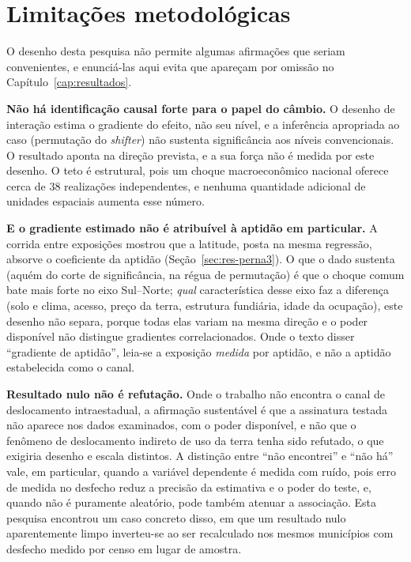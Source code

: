 \section{Limitações metodológicas}
\label{sec:met-limites}

O desenho desta pesquisa não permite algumas afirmações que seriam
convenientes, e enunciá-las aqui evita que apareçam por omissão no
Capítulo~\ref{cap:resultados}.

\textbf{Não há identificação causal forte para o papel do câmbio.} O desenho
de interação estima o gradiente do efeito, não seu nível, e a inferência
apropriada ao caso (permutação do \emph{shifter}) não sustenta significância
aos níveis convencionais. O resultado aponta na direção prevista, e a sua força
não é medida por este desenho. O
teto é estrutural, pois um choque macroeconômico nacional oferece cerca de 38
realizações independentes, e nenhuma quantidade adicional de unidades
espaciais aumenta esse número.

\textbf{E o gradiente estimado não é atribuível à aptidão em particular.} A
corrida entre exposições mostrou que a latitude, posta na mesma regressão,
absorve o coeficiente da aptidão (Seção~\ref{sec:res-perna3}). O que o dado
sustenta (aquém do corte de significância, na régua de permutação) é
que o choque comum bate mais forte no eixo Sul--Norte; \emph{qual}
característica desse eixo faz a diferença (solo e clima, acesso, preço da
terra, estrutura fundiária, idade da ocupação), este desenho não separa,
porque todas elas variam na mesma direção e o poder disponível não distingue
gradientes correlacionados. Onde o texto disser ``gradiente de aptidão'',
leia-se a exposição \emph{medida} por aptidão, e não a aptidão estabelecida
como o canal.

\textbf{Resultado nulo não é refutação.} Onde o trabalho não encontra o canal
de deslocamento intraestadual, a afirmação sustentável é que a assinatura
testada não aparece nos dados examinados, com o poder disponível, e não que o
fenômeno de deslocamento indireto de uso da terra tenha sido refutado, o que
exigiria desenho e escala distintos. A distinção entre ``não encontrei'' e
``não há'' vale, em particular, quando a variável dependente é medida com
ruído, pois erro de medida no desfecho reduz a precisão da estimativa e o
poder do teste, e, quando não é puramente aleatório, pode também atenuar a
associação. Esta pesquisa encontrou um caso concreto disso, em que um resultado nulo
aparentemente limpo inverteu-se ao ser recalculado nos mesmos municípios com
desfecho medido por censo em lugar de amostra.

